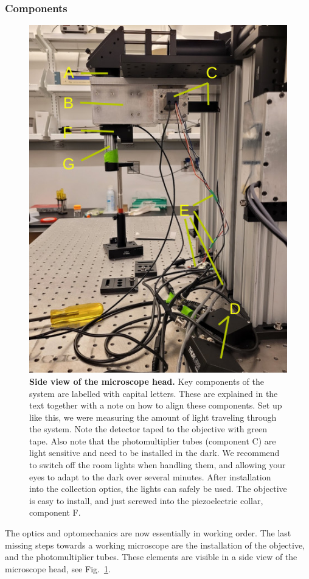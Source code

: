 \documentclass[10pt,letterpaper]{article}
\begin{document}
\subsubsection{Components}
%
\begin{figure}
    \includegraphics[width=.5\textwidth]{sfig6.jpg}
  \caption{{\bf Side view of the microscope head.} Key components of the system are labelled with capital letters. These are explained in the text together with a note on how to align these components.\newline
  Set up like this, we were measuring the amount of light traveling through the system. Note the detector taped to the objective with green tape.\newline
  Also note that the photomultiplier tubes (component C) are light sensitive and need to be installed in the dark. We recommend to switch off the room lights when handling them, and allowing your eyes to adapt to the dark over several minutes. After installation into the collection optics, the lights can safely be used. The objective is easy to install, and just screwed into the piezoelectric collar, component F.}
  \label{sfig6}
\end{figure}
%
The optics and optomechanics are now essentially in working order. The last missing steps towards a working microscope are the installation of the objective, and the photomultiplier tubes. These elements are visible in a side view of the microscope head, see Fig.~\ref{sfig6}.
%
\end{document}

